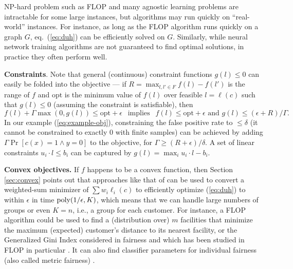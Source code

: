 \documentclass[final, 12pt]{colt2018} %
\newcommand{\eps}{\epsilon}
\newcommand{\poly}{\mathop{\mbox{\text{poly}}}}
\begin{document}
NP-hard problem such as FLOP and many agnostic learning problems are intractable for some large instances, but algorithms may run quickly on ``real-world'' instances. For instance, as long as the FLOP algorithm runs quickly on a graph $G$, eq.~(\ref{eq:duh}) can be efficiently solved on $G$. Similarly, while neural network training algorithms are not guaranteed to find optimal solutions, in practice they often perform well. %


\smallskip \noindent
\textbf{Constraints}. Note that general (continuous) constraint functions $g(l)\leq 0$ can easily be folded into the objective --- if $R=\max_{l,l' \in F} f(l)- f(l')$ is the range of $f$ and $\mathrm{opt}$ is the minimum value of $f(l)$ over feasible $l=\ell(c)$ such that $g(l)\leq 0$ (assuming the constraint is satisfiable), then 
\begin{equation}\label{eq:constraints}
f(l) + \Gamma \max(0, g(l)) \leq \mathrm{opt} + \eps ~~\text{ implies }~~ f(l) \leq \mathrm{opt} + \eps \text{ and } g(l) \leq (\eps+R)/\Gamma.
\end{equation}
In our example (\ref{eq:example-obj}), constraining the false positive rate to $\leq \delta$ (it cannot be constrained to exactly 0 with finite samples) can be achieved by adding $\Gamma \Pr[c(x)=1\wedge y=0]$ to the objective, for $\Gamma \geq (R+\eps)/\delta$. A set of linear constraints $u_i \cdot l \leq b_i$ can be captured by $g(l)=\max_i u_i \cdot l - b_i$.

\smallskip \noindent
\textbf{Convex objectives.} If $f$ happens to be a convex function, then Section \ref{sec:convex} points out that approaches like that of \cite{NarasimhanRS015} can be used to convert a weighted-sum minimizer of $\sum w_i \ell_i(c)$ to efficiently optimize (\ref{eq:duh}) to within $\eps$ in time $\poly(1/\eps, K)$, which means that we can handle large numbers of groups or even $K=n$, i.e., a group for each customer. For instance, a FLOP algorithm could be used to find a (distribution over) $m$ facilities that minimize the maximum (expected) customer's distance to its nearest facility, or the Generalized Gini Index considered in fairness \citep{weymark1981, busa2017multi} and which has been studied in FLOP in particular \citep{drezner2009equitable}. It can also find classifier parameters for individual fairness (also called metric fairness) \citep{Dwork:2012}.
\end{document}
